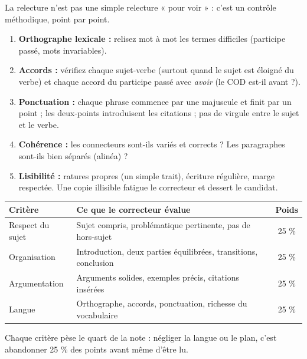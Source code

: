 \documentclass[11pt]{article}
\newcounter{popsec}
\newcounter{popsub}
\newcommand{\courssub}[1]{%
  \stepcounter{popsub}%
  \par\vspace{9pt}\noindent{\popxbold\fontsize{11.5}{13}\selectfont\color{popink}{\color{poporange}\thepopsec.\thepopsub}\hspace{6pt}#1}\par\nopagebreak\vspace{4pt}
}
\begin{document}
\courssub{La relecture finale}

La relecture n'est pas une simple relecture « pour voir » : c'est un contrôle méthodique, point par point.

\begin{methode}
\begin{enumerate}
\item \textbf{Orthographe lexicale :} relisez mot à mot les termes difficiles (participe passé, mots invariables).
\item \textbf{Accords :} vérifiez chaque sujet-verbe (surtout quand le sujet est éloigné du verbe) et chaque accord du participe passé avec \emph{avoir} (le COD est-il avant ?).
\item \textbf{Ponctuation :} chaque phrase commence par une majuscule et finit par un point ; les deux-points introduisent les citations ; pas de virgule entre le sujet et le verbe.
\item \textbf{Cohérence :} les connecteurs sont-ils variés et corrects ? Les paragraphes sont-ils bien séparés (alinéa) ?
\item \textbf{Lisibilité :} ratures propres (un simple trait), écriture régulière, marge respectée. Une copie illisible fatigue le correcteur et dessert le candidat.
\end{enumerate}
\end{methode}

\begin{exemplebox}
\begin{center}
\begin{tabularx}{\linewidth}{|l|X|c|}\hline
\rowcolor{popblueL} \textbf{Critère} & \textbf{Ce que le correcteur évalue} & \textbf{Poids} \\ \hline
Respect du sujet & Sujet compris, problématique pertinente, pas de hors-sujet & 25 \% \\ \hline
Organisation & Introduction, deux parties équilibrées, transitions, conclusion & 25 \% \\ \hline
Argumentation & Arguments solides, exemples précis, citations insérées & 25 \% \\ \hline
Langue & Orthographe, accords, ponctuation, richesse du vocabulaire & 25 \% \\ \hline
\end{tabularx}
\end{center}
Chaque critère pèse le quart de la note : négliger la langue ou le plan, c'est abandonner 25 \% des points avant même d'être lu.
\end{exemplebox}
\end{document}
